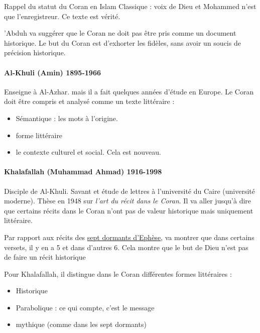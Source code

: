 Rappel du statut du Coran en Islam Classique : voix de Dieu et Mohammed n'est que l'enregistreur. Ce texte est vérité.

'Abduh va suggérer que le Coran ne doit pas être pris comme un document historique. Le but du Coran est d'exhorter les fidèles, sans avoir un soucis de précision historique.

\paragraph{Al-Khuli (Amin) 1895-1966} Enseigne à Al-Azhar. mais il a fait quelques années d'étude en Europe. Le Coran doit être compris et analysé comme un texte littéraire : 
\begin{itemize}
    \item Sémantique : les mots à l'origine. 
    \item forme littéraire
    \item le contexte culturel et social. Cela est nouveau.
\end{itemize}

\paragraph{Khalafallah (Muhammad Ahmad) 1916-1998 } Disciple de Al-Khuli. Savant et étude de lettres à l'université du Caire (université moderne). Thèse en 1948 sur \textit{l'art du récit dans le Coran}. Il va aller jusqu'à dire que certains récits dans le Coran n'ont pas de valeur historique mais uniquement littéraire. 

\begin{Ex}
Par rapport aux récits des \href{https://fr.wikipedia.org/wiki/Sept_Dormants_d\%27\%C3\%89ph\%C3\%A8se#:~:text=Les\%20Sept\%20Dormants\%20d'\%C3\%89ph\%C3\%A8se,r\%C3\%A9cit\%20au\%20contexte\%20arabo\%2Dmusulman.}{sept dormants d'Ephèse}, va montrer que dans certains versets, il y en a 5 et dans d'autres 6. Cela montre que le but de Dieu n'est pas de faire un récit historique
\end{Ex}

Pour Khalafallah, il distingue dans le Coran différentes formes littéraires : 
\begin{itemize}
    \item Historique
    \item Parabolique : ce qui compte, c'est le message
    \item mythique (comme dans les sept dormants)
\end{itemize}

